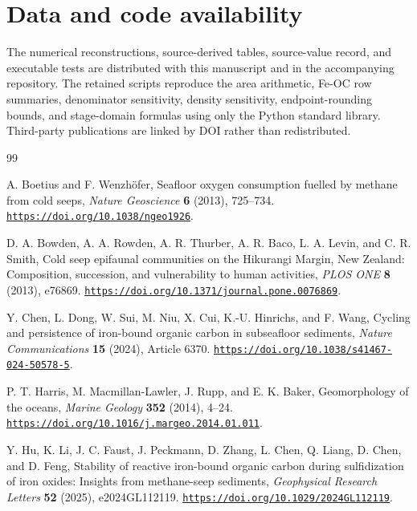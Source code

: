 \documentclass[11pt,letterpaper]{article}
\begin{document}
\section{Data and code availability}

The numerical reconstructions, source-derived tables, source-value record, and executable tests are distributed with this manuscript and in the accompanying repository. The retained scripts reproduce the area arithmetic, Fe-OC row summaries, denominator sensitivity, density sensitivity, endpoint-rounding bounds, and stage-domain formulas using only the Python standard library. Third-party publications are linked by DOI rather than redistributed.

\begin{thebibliography}{99}
\small

A. Boetius and F. Wenzh\"ofer,
Seafloor oxygen consumption fuelled by methane from cold seeps,
\emph{Nature Geoscience} \textbf{6} (2013), 725--734.
\href{https://doi.org/10.1038/ngeo1926}
{\nolinkurl{https://doi.org/10.1038/ngeo1926}}.

D. A. Bowden, A. A. Rowden, A. R. Thurber, A. R. Baco, L. A. Levin, and C. R. Smith,
Cold seep epifaunal communities on the Hikurangi Margin, New Zealand:
Composition, succession, and vulnerability to human activities,
\emph{PLOS ONE} \textbf{8} (2013), e76869.
\href{https://doi.org/10.1371/journal.pone.0076869}
{\nolinkurl{https://doi.org/10.1371/journal.pone.0076869}}.

Y. Chen, L. Dong, W. Sui, M. Niu, X. Cui, K.-U. Hinrichs, and F. Wang,
Cycling and persistence of iron-bound organic carbon in subseafloor sediments,
\emph{Nature Communications} \textbf{15} (2024), Article 6370.
\href{https://doi.org/10.1038/s41467-024-50578-5}
{\nolinkurl{https://doi.org/10.1038/s41467-024-50578-5}}.

P. T. Harris, M. Macmillan-Lawler, J. Rupp, and E. K. Baker,
Geomorphology of the oceans,
\emph{Marine Geology} \textbf{352} (2014), 4--24.
\href{https://doi.org/10.1016/j.margeo.2014.01.011}
{\nolinkurl{https://doi.org/10.1016/j.margeo.2014.01.011}}.

Y. Hu, K. Li, J. C. Faust, J. Peckmann, D. Zhang, L. Chen, Q. Liang,
D. Chen, and D. Feng,
Stability of reactive iron-bound organic carbon during sulfidization of iron oxides:
Insights from methane-seep sediments,
\emph{Geophysical Research Letters} \textbf{52} (2025), e2024GL112119.
\href{https://doi.org/10.1029/2024GL112119}
{\nolinkurl{https://doi.org/10.1029/2024GL112119}}.


\end{thebibliography}
\end{document}
